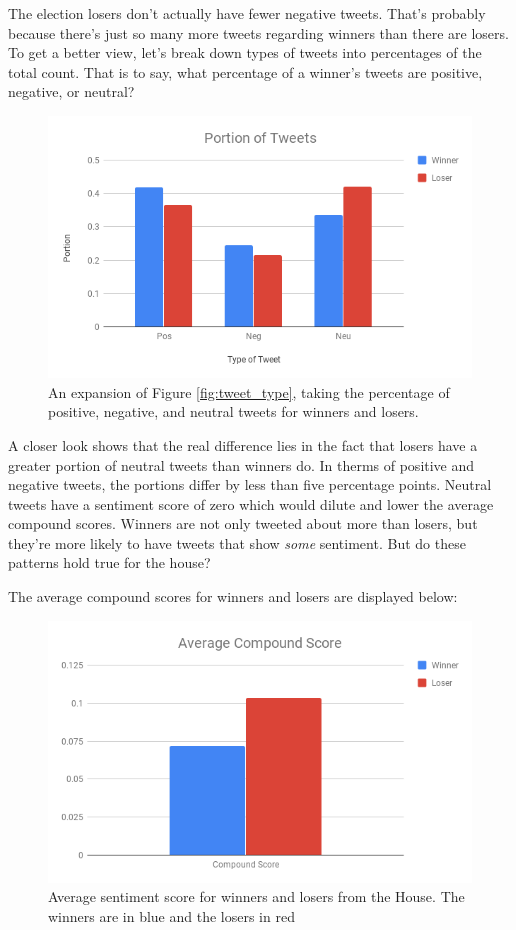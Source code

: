 \documentclass[11pt, twoside, reqno]{book}
\begin{document}
The election losers don't actually have fewer negative tweets. That's probably because there's just so many more tweets regarding winners than there are losers. To get a better view, let's break down types of tweets into percentages of the total count. That is to say, what percentage of a winner's tweets are positive, negative, or neutral?

\begin{figure}[H]
\centering
	\includegraphics[scale=0.5]{tweet_breakdown}
	\caption{An expansion of Figure \ref{fig:tweet_type}, taking the percentage of positive, negative, and neutral tweets for winners and losers.}\label{fig:tweet_breakdown}	
\end{figure}

A closer look shows that the real difference lies in the fact that losers have a greater portion of neutral tweets than winners do. In therms of positive and negative tweets, the portions differ by less than five percentage points. Neutral tweets have a sentiment score of zero which would dilute and lower the average compound scores. Winners are not only tweeted about more than losers, but they're more likely to have tweets that show \textit{some} sentiment. But do these patterns hold true for the house?

The average compound scores for winners and losers are displayed below:

\begin{figure}[H]
\centering
	\includegraphics[scale=0.5]{house_compound}
	\caption{Average sentiment score for winners and losers from the House. The winners are in blue and the losers in red}\label{fig:house_compound}
\end{figure}
\end{document}
